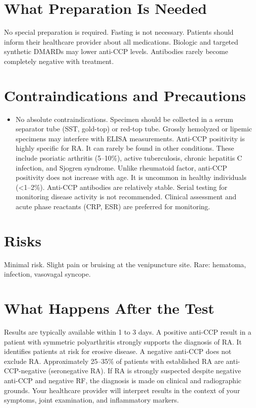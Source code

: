 \section*{What Preparation Is Needed}
No special preparation is required. Fasting is not necessary. Patients should inform their healthcare provider about all medications. Biologic and targeted synthetic DMARDs may lower anti-CCP levels. Antibodies rarely become completely negative with treatment.

\section*{Contraindications and Precautions}
\begin{itemize}
  \item No absolute contraindications. Specimen should be collected in a serum separator tube (SST, gold-top) or red-top tube. Grossly hemolyzed or lipemic specimens may interfere with ELISA measurements. Anti-CCP positivity is highly specific for RA. It can rarely be found in other conditions. These include psoriatic arthritis (5--10\%), active tuberculosis, chronic hepatitis C infection, and Sjogren syndrome. Unlike rheumatoid factor, anti-CCP positivity does not increase with age. It is uncommon in healthy individuals (<1--2\%). Anti-CCP antibodies are relatively stable. Serial testing for monitoring disease activity is not recommended. Clinical assessment and acute phase reactants (CRP, ESR) are preferred for monitoring.
\end{itemize}
\section*{Risks}
Minimal risk. Slight pain or bruising at the venipuncture site. Rare: hematoma, infection, vasovagal syncope.

\section*{What Happens After the Test}
Results are typically available within 1 to 3 days. A positive anti-CCP result in a patient with symmetric polyarthritis strongly supports the diagnosis of RA. It identifies patients at risk for erosive disease. A negative anti-CCP does not exclude RA. Approximately 25--35\% of patients with established RA are anti-CCP-negative (seronegative RA). If RA is strongly suspected despite negative anti-CCP and negative RF, the diagnosis is made on clinical and radiographic grounds. Your healthcare provider will interpret results in the context of your symptoms, joint examination, and inflammatory markers.

